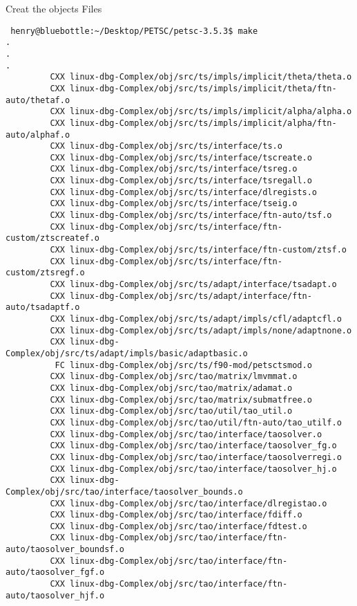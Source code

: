 \documentclass{article}
\begin{document}
Creat the objects Files
\begin{scriptsize}\begin{verbatim}
 henry@bluebottle:~/Desktop/PETSC/petsc-3.5.3$ make
.
.
.
         CXX linux-dbg-Complex/obj/src/ts/impls/implicit/theta/theta.o
         CXX linux-dbg-Complex/obj/src/ts/impls/implicit/theta/ftn-auto/thetaf.o
         CXX linux-dbg-Complex/obj/src/ts/impls/implicit/alpha/alpha.o
         CXX linux-dbg-Complex/obj/src/ts/impls/implicit/alpha/ftn-auto/alphaf.o
         CXX linux-dbg-Complex/obj/src/ts/interface/ts.o
         CXX linux-dbg-Complex/obj/src/ts/interface/tscreate.o
         CXX linux-dbg-Complex/obj/src/ts/interface/tsreg.o
         CXX linux-dbg-Complex/obj/src/ts/interface/tsregall.o
         CXX linux-dbg-Complex/obj/src/ts/interface/dlregists.o
         CXX linux-dbg-Complex/obj/src/ts/interface/tseig.o
         CXX linux-dbg-Complex/obj/src/ts/interface/ftn-auto/tsf.o
         CXX linux-dbg-Complex/obj/src/ts/interface/ftn-custom/ztscreatef.o
         CXX linux-dbg-Complex/obj/src/ts/interface/ftn-custom/ztsf.o
         CXX linux-dbg-Complex/obj/src/ts/interface/ftn-custom/ztsregf.o
         CXX linux-dbg-Complex/obj/src/ts/adapt/interface/tsadapt.o
         CXX linux-dbg-Complex/obj/src/ts/adapt/interface/ftn-auto/tsadaptf.o
         CXX linux-dbg-Complex/obj/src/ts/adapt/impls/cfl/adaptcfl.o
         CXX linux-dbg-Complex/obj/src/ts/adapt/impls/none/adaptnone.o
         CXX linux-dbg-Complex/obj/src/ts/adapt/impls/basic/adaptbasic.o
          FC linux-dbg-Complex/obj/src/ts/f90-mod/petsctsmod.o
         CXX linux-dbg-Complex/obj/src/tao/matrix/lmvmmat.o
         CXX linux-dbg-Complex/obj/src/tao/matrix/adamat.o
         CXX linux-dbg-Complex/obj/src/tao/matrix/submatfree.o
         CXX linux-dbg-Complex/obj/src/tao/util/tao_util.o
         CXX linux-dbg-Complex/obj/src/tao/util/ftn-auto/tao_utilf.o
         CXX linux-dbg-Complex/obj/src/tao/interface/taosolver.o
         CXX linux-dbg-Complex/obj/src/tao/interface/taosolver_fg.o
         CXX linux-dbg-Complex/obj/src/tao/interface/taosolverregi.o
         CXX linux-dbg-Complex/obj/src/tao/interface/taosolver_hj.o
         CXX linux-dbg-Complex/obj/src/tao/interface/taosolver_bounds.o
         CXX linux-dbg-Complex/obj/src/tao/interface/dlregistao.o
         CXX linux-dbg-Complex/obj/src/tao/interface/fdiff.o
         CXX linux-dbg-Complex/obj/src/tao/interface/fdtest.o
         CXX linux-dbg-Complex/obj/src/tao/interface/ftn-auto/taosolver_boundsf.o
         CXX linux-dbg-Complex/obj/src/tao/interface/ftn-auto/taosolver_fgf.o
         CXX linux-dbg-Complex/obj/src/tao/interface/ftn-auto/taosolver_hjf.o

\end{verbatim}
\end{scriptsize}
\end{document}
